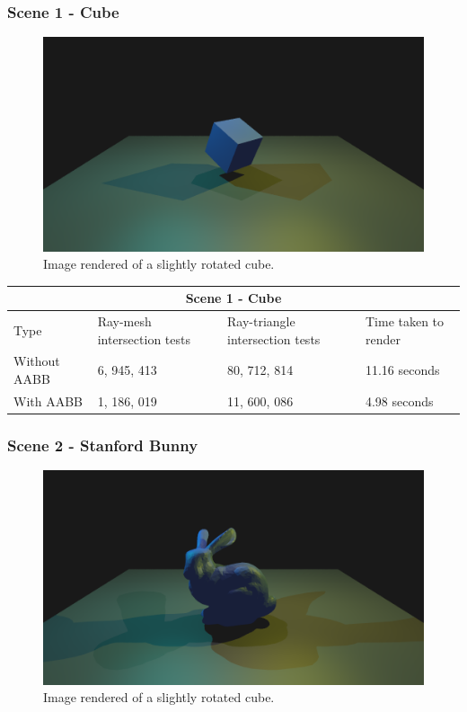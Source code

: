 \documentclass[11pt,a4paper]{article}
\begin{document}
	\subsubsection{Scene 1 - Cube}
	\begin{figure}[H]
		\centering
		\captionsetup{justification=centering}
		\includegraphics[width=.5\textwidth]{cubescene}\quad
		\caption{Image rendered of a slightly rotated cube.}
	\end{figure}
	
	\begin{table}[h]
		\centering
		\begin{tabular}{ |p{3cm}||p{3cm}|p{3cm}|p{3cm}|  }
			\hline
			\multicolumn{4}{|c|}{Scene 1 - Cube} \\
			\hline
			Type   &   Ray-mesh intersection tests  & Ray-triangle intersection tests &   Time taken to render\\
			\hline
			Without AABB   & 6, 945, 413    &80, 712, 814&   11.16 seconds\\
			With AABB&   1, 186, 019  &11, 600, 086   &      4.98 seconds\\
			\hline
		\end{tabular}
	\end{table}

	\subsubsection{Scene 2 - Stanford Bunny}
	\begin{figure}[H]
		\centering
		\captionsetup{justification=centering}
		\includegraphics[width=.5\textwidth]{bunnyscene}\quad
		\caption{Image rendered of a slightly rotated cube.}
	\end{figure}
	
\end{document}
